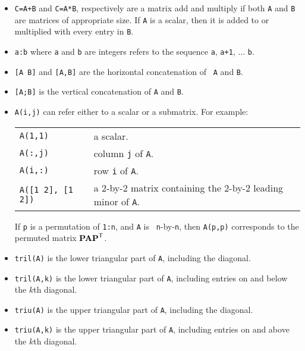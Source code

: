 \documentclass[11pt]{article}
\newcommand{\m}[1]{{\bf{#1}}}       %
\newcommand{\tr}{^{\sf T}}          %
\begin{document}
\begin{itemize}
    \item {\tt C=A+B} and {\tt C=A*B}, respectively are a matrix add and
        multiply if both {\tt A} and {\tt B} are matrices of appropriate size.
        If {\tt A} is a scalar, then it is added to or multiplied with every
        entry in {\tt B}.
    \item {\tt a:b} where {\tt a} and {\tt b} are integers refers to the
        sequence {\tt a}, {\tt a+1}, ... {\tt b}.
    \item {\tt [A B]} and {\tt [A,B]} are the horizontal concatenation of {\tt
        A} and {\tt B}.
    \item {\tt [A;B]} is the vertical concatenation of {\tt A} and {\tt B}.
    \item {\tt A(i,j)} can refer either to a scalar or a submatrix.
        For example: \newline
        \vspace{0.05in}
        \begin{tabular}{ll}
        \hline
        {\tt A(1,1)} & a scalar. \\
        {\tt A(:,j)} & column {\tt j} of {\tt A}. \\
        {\tt A(i,:)} & row {\tt i} of {\tt A}. \\
        {\tt A([1 2], [1 2])} & a 2-by-2 matrix containing the 2-by-2 leading
        minor of {\tt A}. \\
        \hline
        \end{tabular} \newline
        \vspace{0.1in}
        If {\tt p} is a permutation of {\tt 1:n}, and {\tt A} is {\tt
        n}-by-{\tt n}, then {\tt A(p,p)} corresponds to the permuted matrix
        $\m{PAP}\tr$.

    \item {\tt tril(A)} is the lower triangular part of {\tt A}, including the
        diagonal.

    \item {\tt tril(A,k)} is the lower triangular part of {\tt A}, including
        entries on and below the $k$th diagonal.

    \item {\tt triu(A)} is the upper triangular part of {\tt A}, including the
        diagonal.

    \item {\tt triu(A,k)} is the upper triangular part of {\tt A}, including
        entries on and above the $k$th diagonal.


\end{itemize}
\end{document}
